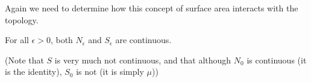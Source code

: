 \documentclass[a4paper,11pt]{article}
\begin{document}
\begin{comment}
We should check that this new definition of surface area agress with any other
definition of surface area we might encounter in certain cases.  We so so in
the following theorem, which is not required for the remaining results, but
helps to ensure that our effort is worthwhile.

\begin{thm}
\label{thm:smoothSurfaceAreas}
When $K$ is a compact smooth submanifold (with boundary) of $\bbR^m$, $S(K)$
agrees with the standard definition of surface area in terms of the integral
over the boundary manifold of the volume form induced by the Riemannian metric
induced by the ambient metric on $\bbR^m$.
\end{thm}

\begin{proof}
TODO (not much of an idea yet).
\end{proof}
\end{comment}

Again we need to determine how this concept of surface area interacts with
the topology.

\begin{lemma}
\label{thm:surfaceAreaContinuous}
For all $\epsilon>0$, both $N_\epsilon$ and $S_\epsilon$ are continuous.
\end{lemma}

(Note that $S$ is very much not continuous, and that although $N_0$ is
continuous (it is the identity), $S_0$ is not (it is simply $\mu$))
\end{document}
